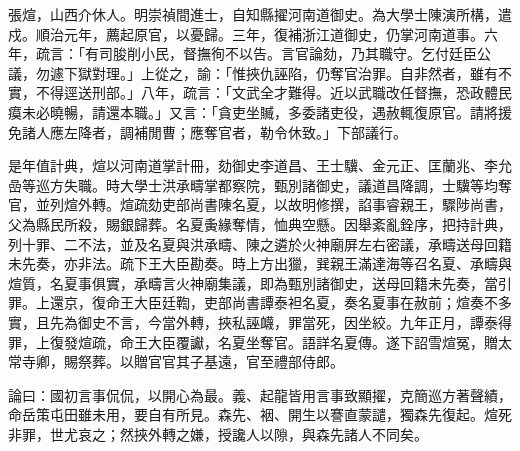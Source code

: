 \begin{pinyinscope}
張煊，山西介休人。明崇禎間進士，自知縣擢河南道御史。為大學士陳演所構，遣戍。順治元年，薦起原官，以憂歸。三年，復補浙江道御史，仍掌河南道事。六年，疏言：「有司朘削小民，督撫徇不以告。言官論劾，乃其職守。乞付廷臣公議，勿遽下獄對理。」上從之，諭：「惟挾仇誣陷，仍奪官治罪。自非然者，雖有不實，不得逕送刑部。」八年，疏言：「文武全才難得。近以武職改任督撫，恐政體民瘼未必曉暢，請還本職。」又言：「貪吏坐贓，多委諸吏役，遇赦輒復原官。請將援免諸人應左降者，調補閒曹；應奪官者，勒令休致。」下部議行。

是年值計典，煊以河南道掌計冊，劾御史李道昌、王士驥、金元正、匡蘭兆、李允嵒等巡方失職。時大學士洪承疇掌都察院，甄別諸御史，議道昌降調，士驥等均奪官，並列煊外轉。煊疏劾吏部尚書陳名夏，以故明修撰，諂事睿親王，驟陟尚書，父為縣民所殺，賜銀歸葬。名夏夤緣奪情，恤典空懸。因舉紊亂銓序，把持計典，列十罪、二不法，並及名夏與洪承疇、陳之遴於火神廟屏左右密議，承疇送母回籍未先奏，亦非法。疏下王大臣勘奏。時上方出獵，巽親王滿達海等召名夏、承疇與煊質，名夏事俱實，承疇言火神廟集議，即為甄別諸御史，送母回籍未先奏，當引罪。上還京，復命王大臣廷鞫，吏部尚書譚泰袒名夏，奏名夏事在赦前；煊奏不多實，且先為御史不言，今當外轉，挾私誣衊，罪當死，因坐絞。九年正月，譚泰得罪，上復發煊疏，命王大臣覆讞，名夏坐奪官。語詳名夏傳。遂下詔雪煊冤，贈太常寺卿，賜祭葬。以贈官官其子基遠，官至禮部侍郎。

論曰：國初言事侃侃，以開心為最。義、起龍皆用言事致顯擢，克簡巡方著聲績，命岳策屯田雖未用，要自有所見。森先、裀、開生以謇直蒙譴，獨森先復起。煊死非罪，世尤哀之；然挾外轉之嫌，授讒人以隙，與森先諸人不同矣。


\end{pinyinscope}